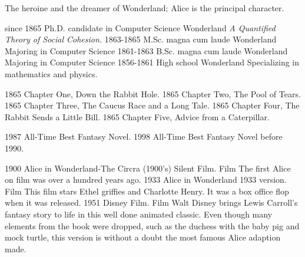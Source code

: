 \documentclass[icon]{twentysecondcv}
\begin{document}
The heroine and the dreamer of Wonderland;  Alice is the principal character.


\begin{twentyicon}
  \twentyitemicon
    {\faGraduationCap}
    {since 1865}
    {Ph.D. {\normalfont candidate in Computer Science}}
    {Wonderland}
    {\emph{A Quantified Theory of Social Cohesion.}}
  \twentyitemicon
    {\faBatteryThreeQuarters}
    {1863-1865}
    {M.Sc. magna cum laude}
    {Wonderland}
    {Majoring in Computer Science}
  \twentyitemicon
    {\faBatteryHalf}
    {1861-1863}
    {B.Sc. magna cum laude}
    {Wonderland}
    {Majoring in Computer Science}
  \twentyitemicon
    {\faBatteryQuarter}
    {1856-1861}
    {High school}
    {Wonderland}
    {Specializing in mathematics and physics.}
\end{twentyicon}

\begin{twentyshort}
  \twentyitemshort
    {1865}
    {Chapter One, Down the Rabbit Hole.}
  \twentyitemshort
    {1865}
    {Chapter Two, The Pool of Tears.}
  \twentyitemshort
    {1865}
    {Chapter Three,  The Caucus Race and a Long Tale.}
  \twentyitemshort
    {1865}
    {Chapter Four,  The Rabbit Sends a Little Bill.}
  \twentyitemshort
    {1865}
    {Chapter Five,  Advice from a Caterpillar.}
\end{twentyshort}

\begin{twentyshorticon}
  \twentyitemshorticon
    {\faBolt}
    {1987}
    {All-Time Best Fantasy Novel.}
  \twentyitemshorticon
    {\faBomb}
    {1998}
    {All-Time Best Fantasy Novel before 1990.}
\end{twentyshorticon}

\begin{twenty}
  \twentyitem
    {1900}
    {Alice in Wonderland-The Circra (1900's) Silent Film.}
    {Film}
    {The first Alice on film was over a hundred years ago.}
  \twentyitem
    {1933}
    {Alice in Wonderland 1933 version.}
    {Film}
    {This film stars Ethel griffies and Charlotte Henry. It was a box office flop when it was released.}
\twentyitem
    {1951}
    {Disney Film.}
    {Film}
    {Walt Disney brings Lewis Carroll's fantasy story to life in this well done animated classic. Even though many elements from the book were dropped, such as the duchess with the baby pig and mock turtle, this version is without a doubt the most famous Alice adaption made.}
\end{twenty}
\end{document}
